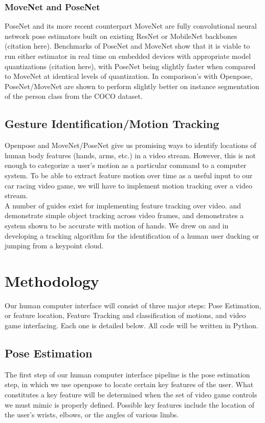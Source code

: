 \documentclass[10pt,twocolumn,letterpaper]{article}
\begin{document}
\subsubsection{MoveNet and PoseNet}

PoseNet and its more recent counterpart MoveNet are fully convolutional neural network pose 
estimators built on existing ResNet or MobileNet backbones (citation here). Benchmarks of PoseNet and MoveNet show that it is 
viable to run either estimator in real time on embedded devices with appropriate 
model quantizations (citation here), with PoseNet being slightly faster when compared to MoveNet at identical 
levels of quantization. In comparison's with Openpose, PoseNet/MoveNet are shown to perform 
slightly better on instance segmentation of the person class from the COCO dataset.

\subsection{Gesture Identification/Motion Tracking}
Openpose and MoveNet/PoseNet give us promising ways to identify locations of human body features 
(hands, arms, etc.) in a video stream. However, this is not enough to categorize a user's motion 
as a particular command to a computer system. To be able to extract feature motion over time 
as a useful input to our car racing video game, we will have to implement motion tracking 
over a video stream.\\ 

A number of guides exist for implementing feature tracking over video. \cite{tracking_1} 
and \cite{tracking_2} demonstrate simple object tracking across video frames, and \cite{tracking_2} 
demonstrates a system shown to be accurate with motion of hands. We drew on \cite{tracking_1} and 
\cite{tracking_2} in developing a tracking algorithm for the identification of a human user ducking 
or jumping from a keypoint cloud.

\section{Methodology}
Our human computer interface will consist of three major steps: Pose Estimation, or feature 
location, Feature Tracking and classification of motions, and video game interfacing. Each one 
is detailed below. All code will be written in Python.

\subsection{Pose Estimation}
The first step of our human computer interface pipeline is the pose estimation step, in which 
we use openpose to locate certain key features of the user. What constitutes a key feature will 
be determined when the set of video game controls we must mimic is properly defined. Possible 
key features include the location of the user's wrists, elbows, or the angles of various limbs. 
\end{document}

